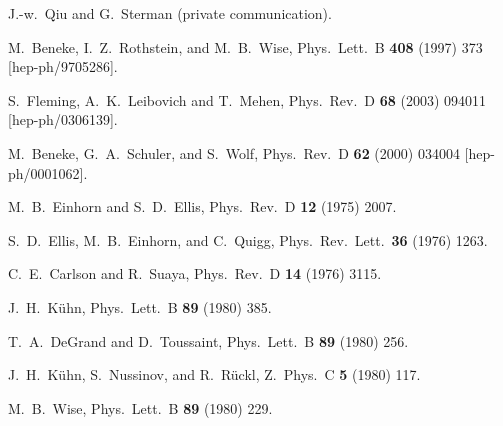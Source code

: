 \begin{thebibliography}{999}
J.-w.~Qiu and G.~Sterman (private communication).

M.~Beneke, I.~Z.~Rothstein, and M.~B.~Wise,
Phys.\ Lett.\ B {\bf 408} (1997) 373
[hep-ph/9705286].

S.~Fleming, A.~K.~Leibovich and T.~Mehen,
Phys.\ Rev.\ D {\bf 68} (2003) 094011 
[hep-ph/0306139].

M.~Beneke, G.~A.~Schuler, and S.~Wolf,
Phys.\ Rev.\ D {\bf 62} (2000) 034004
[hep-ph/0001062].


M.~B.~Einhorn and S.~D.~Ellis,
Phys.\ Rev.\ D {\bf 12} (1975) 2007.

S.~D.~Ellis, M.~B.~Einhorn, and C.~Quigg,
Phys.\ Rev.\ Lett.\  {\bf 36} (1976) 1263.

C.~E.~Carlson and R.~Suaya,
Phys.\ Rev.\ D {\bf 14} (1976) 3115.

J.~H.~K\"uhn,
Phys.\ Lett.\ B {\bf 89} (1980) 385.

T.~A.~DeGrand and D.~Toussaint,
Phys.\ Lett.\ B {\bf 89} (1980) 256.

J.~H.~K\"uhn, S.~Nussinov, and R.~R\"uckl,
Z.\ Phys.\ C {\bf 5} (1980) 117.

M.~B.~Wise,
Phys.\ Lett.\ B {\bf 89} (1980) 229.


\end{thebibliography}
